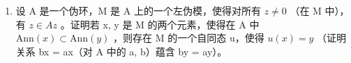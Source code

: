 \BourbakiAppendixExercises

\begin{enumerate}
\def\labelenumi{\arabic{enumi}.}
\tightlist
\item
  设 A 是一个伪环，M 是 A 上的一个左伪模，使得对所有 \(z \neq 0\) （在 M 中），有 \(z \in Az\) 。证明若 x, y 是 M 的两个元素，使得在 A 中 \(\text{Ann}(x) \subset \text{Ann}(y)\) ，则存在 M 的一个自同态 u，使得 \(u(x) = y\) （证明关系 bx = ax（对 A 中的 a, b）蕴含 by = ay）。
\end{enumerate}

